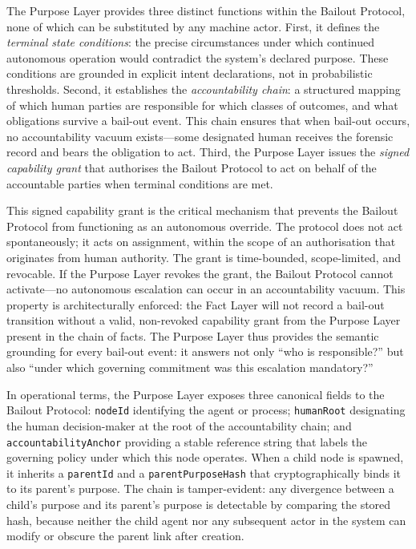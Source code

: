 The Purpose Layer provides three distinct functions within the Bailout Protocol, none of which can be substituted by any machine actor. First, it defines the \emph{terminal state conditions}: the precise circumstances under which continued autonomous operation would contradict the system's declared purpose. These conditions are grounded in explicit intent declarations, not in probabilistic thresholds. Second, it establishes the \emph{accountability chain}: a structured mapping of which human parties are responsible for which classes of outcomes, and what obligations survive a bail-out event. This chain ensures that when bail-out occurs, no accountability vacuum exists---some designated human receives the forensic record and bears the obligation to act. Third, the Purpose Layer issues the \emph{signed capability grant} that authorises the Bailout Protocol to act on behalf of the accountable parties when terminal conditions are met.

This signed capability grant is the critical mechanism that prevents the Bailout Protocol from functioning as an autonomous override. The protocol does not act spontaneously; it acts on assignment, within the scope of an authorisation that originates from human authority. The grant is time-bounded, scope-limited, and revocable. If the Purpose Layer revokes the grant, the Bailout Protocol cannot activate---no autonomous escalation can occur in an accountability vacuum. This property is architecturally enforced: the Fact Layer will not record a bail-out transition without a valid, non-revoked capability grant from the Purpose Layer present in the chain of facts. The Purpose Layer thus provides the semantic grounding for every bail-out event: it answers not only ``who is responsible?'' but also ``under which governing commitment was this escalation mandatory?''

In operational terms, the Purpose Layer exposes three canonical fields to the Bailout Protocol: \texttt{nodeId} identifying the agent or process; \texttt{humanRoot} designating the human decision-maker at the root of the accountability chain; and \texttt{accountabilityAnchor} providing a stable reference string that labels the governing policy under which this node operates. When a child node is spawned, it inherits a \texttt{parentId} and a \texttt{parentPurposeHash} that cryptographically binds it to its parent's purpose. The chain is tamper-evident: any divergence between a child's purpose and its parent's purpose is detectable by comparing the stored hash, because neither the child agent nor any subsequent actor in the system can modify or obscure the parent link after creation.

